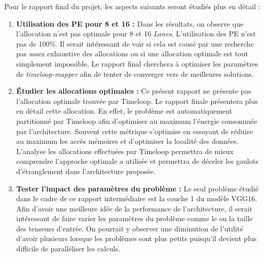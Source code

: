 \documentclass[11pt,letterpaper]{article}
\begin{document}
    \begin{multicols}{2}
        
    \noindent Pour le rapport final du projet, les aspects suivants seront étudiés plus en détail :
    \begin{enumerate}
        \item \textbf{Utilisation des PE pour 8 et 16  :}
            Dans les résultats, on observe que l'allocation n'est pas optimale pour 8 et 16 \textit{Lanes}.
            L'utilisation des PE n'est pas de 100\%. Il serait intéressant de voir si cela est causé par une 
            recherche pas assez exhaustive des allocations ou si une allocation optimale est tout simplement 
            impossible. Le rapport final cherchera à optimiser les paramètres de \textit{timeloop-mapper} afin
            de tenter de converger vers de meilleures solutions.
        \item \textbf{Étudier les allocations optimales :}
            Ce présent rapport ne présente pas l'allocation optimale trouvée par Timeloop. Le rapport finale 
            présentera plus en détail cette allocation. En effet, le problème est automatiquement partitionné
            par Timeloop afin d'optimiser au maximum l'énergie consommée par l'architecture. Souvent cette métrique
            s'optimise en essayant de réduire au maximum les accès mémoires et d'optimiser la localité des données.
            L'analyse les allocations effectuées par Timeloop permettra de mieux comprendre l'approche optimale a utilisée
            et permettra de déceler les goulots d'étranglement dans l'architecture proposée.
        \item \textbf{Tester l'impact des paramètres du problème :} 
            Le seul problème étudié dans le cadre de ce rapport intermédiaire est la couche 1 du modèle VGG16.
            Afin d'avoir une meilleure idée de la performance de l'architecture, il serait intéressant de faire
            varier les paramètres du problème comme le  ou la taille des tenseurs d'entrée. On pourrait
            y observer une diminution de l'utilité d'avoir plusieurs  lorsque les problèmes sont plus petits
            puisqu'il devient plus difficile de paralléliser les calculs.
    \end{enumerate}
    \end{multicols}
\end{document}
